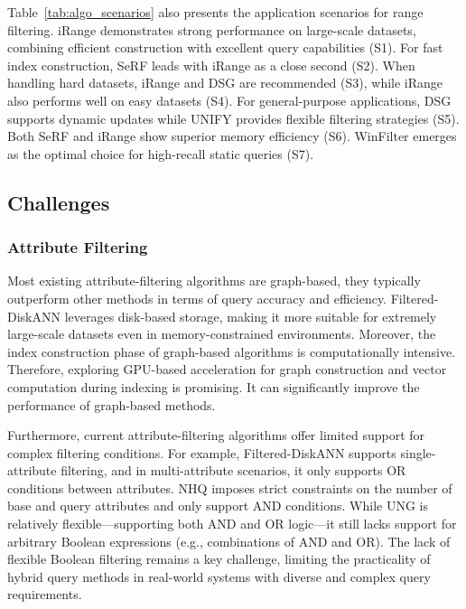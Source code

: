 \documentclass[sigconf, nonacm]{acmart}
\begin{document}
	
Table~\ref{tab:algo_scenarios} also presents the application scenarios for range filtering. iRange demonstrates strong performance on large-scale datasets, combining efficient construction with excellent query capabilities (S1). For fast index construction, SeRF leads with iRange as a close second (S2). When handling hard datasets, iRange and DSG are recommended (S3), while iRange also performs well on easy datasets (S4). For general-purpose applications, DSG supports dynamic updates while UNIFY provides flexible filtering strategies (S5). Both SeRF and iRange show superior memory efficiency (S6). WinFilter emerges as the optimal choice for high-recall static queries (S7).

\subsection{Challenges}
\subsubsection{\textbf{Attribute Filtering}}
Most existing attribute-filtering algorithms are graph-based, they typically outperform other methods in terms of query accuracy and efficiency. Filtered-DiskANN leverages disk-based storage, making it more suitable for extremely large-scale datasets even in memory-constrained environments. Moreover, the index construction phase of graph-based algorithms is computationally intensive. Therefore, exploring GPU-based acceleration for graph construction and vector computation during indexing is promising. It can significantly improve the performance of graph-based methods.

Furthermore, current attribute-filtering algorithms offer limited support for complex filtering conditions. For example, Filtered-DiskANN  supports single-attribute filtering, and in multi-attribute scenarios, it only supports OR conditions between attributes. 
NHQ imposes strict constraints on the number of base and query attributes and only support AND conditions. While UNG is relatively flexible—supporting both AND and OR logic—it still lacks support for arbitrary Boolean expressions (e.g., combinations of AND and OR). The lack of flexible Boolean filtering remains a key challenge, limiting the practicality of hybrid query methods in real-world systems with diverse and complex query requirements.
\end{document}
